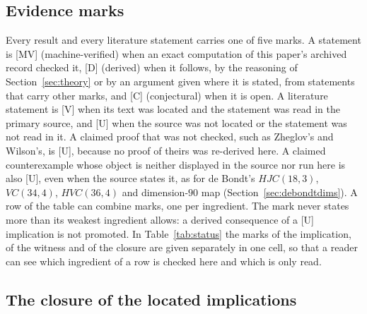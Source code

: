 \documentclass[11pt]{article}
\theoremstyle{remark}
\begin{document}
\subsection{Evidence marks}\label{sec:marks}

Every result and every literature statement carries one of five marks. A statement is [MV] (machine-verified) when an exact computation of this paper's archived record checked it, [D] (derived) when it follows, by the reasoning of Section~\ref{sec:theory} or by an argument given where it is stated, from statements that carry other marks, and [C] (conjectural) when it is open. A literature statement is [V] when its text was located and the statement was read in the primary source, and [U] when the source was not located or the statement was not read in it. A claimed proof that was not checked, such as Zheglov's and Wilson's, is [U], because no proof of theirs was re-derived here. A claimed counterexample whose object is neither displayed in the source nor run here is also [U], even when the source states it, as for de Bondt's $HJC(18,3)$, $VC(34,4)$, $HVC(36,4)$ and dimension-$90$ map (Section~\ref{sec:debondtdims}). A row of the table can combine marks, one per ingredient. The mark never states more than its weakest ingredient allows: a derived consequence of a [U] implication is not promoted. In Table~\ref{tab:status} the marks of the implication, of the witness and of the closure are given separately in one cell, so that a reader can see which ingredient of a row is checked here and which is only read.

\subsection{The closure of the located implications}\label{sec:closure}
\end{document}
